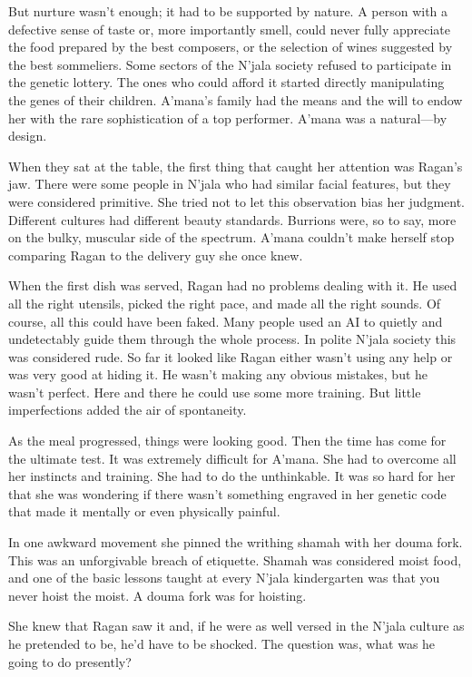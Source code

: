 \documentclass[12pt]{book}
\begin{document}
But nurture wasn't enough; it had to be supported by nature. A person with a defective sense of taste or, more importantly smell, could never fully appreciate the food prepared by the best composers, or the selection of wines suggested by the best sommeliers. Some sectors of the N'jala society refused to participate in the genetic lottery. The ones who could afford it started directly manipulating the genes of their children. A'mana's family had the means and the will to endow her with the rare sophistication of a top performer. A'mana was a natural---by design.

When they sat at the table, the first thing that caught her attention was Ragan's jaw. There were some people in N'jala who had similar facial features, but they were considered primitive. She tried not to let this observation bias her judgment. Different cultures had different beauty standards. Burrions were, so to say, more on the bulky, muscular side of the spectrum. A'mana couldn't make herself stop comparing Ragan to the delivery guy she once knew. 

When the first dish was served, Ragan had no problems dealing with it. He used all the right utensils, picked the right pace, and made all the right sounds. Of course, all this could have been faked. Many people used an AI to quietly and undetectably guide them through the whole process. In polite N'jala society this was considered rude. So far it looked like Ragan either wasn't using any help or was very good at hiding it. He wasn't making any obvious mistakes, but he wasn't perfect. Here and there he could use some more training. But little imperfections added the air of spontaneity.

As the meal progressed, things were looking good. Then the time has come for the ultimate test. It was extremely difficult for A'mana. She had to overcome all her instincts and training. She had to do the unthinkable. It was so hard for her that she was wondering if there wasn't something engraved in her genetic code that made it mentally or even physically painful. 

In one awkward movement she pinned the writhing shamah with her douma fork. This was an unforgivable breach of etiquette. Shamah was considered moist food, and one of the basic lessons taught at every N'jala kindergarten was that you never hoist the moist. A douma fork was for hoisting. 

She knew that Ragan saw it and, if he were as well versed in the N'jala culture as he pretended to be, he'd have to be shocked. The question was, what was he going to do presently?
\end{document}
